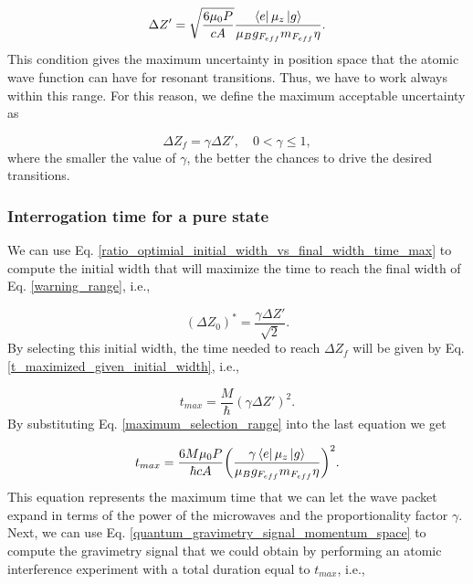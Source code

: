 \documentclass{article}
\begin{document}
\begin{equation}\label{maximum_selection_range}
\Delta Z' = \sqrt{\frac{6 \mu_{0} P}{c A}} \frac{\bra{e} \mu_{z} \ket{g}}{\mu_{B} g_{F_{eff}} m_{F_{eff}} \eta}.
\end{equation}
%
This condition gives the maximum uncertainty in position space that the atomic wave function can have for resonant transitions. Thus, we have to work always within this range. For this reason, we define the maximum acceptable uncertainty as

\begin{equation}\label{warning_range}
    \Delta Z_{f} = \gamma \Delta Z' \mathrm{,} \quad 0 < \gamma \leq 1,
\end{equation}
%
where the smaller the value of $\gamma$, the better the chances to drive the desired transitions. 

\subsubsection{Interrogation time for a pure state}
We can use Eq. \ref{ratio_optimial_initial_width_vs_final_width_time_max} to compute the initial width that will maximize the time to reach the final width of Eq. \ref{warning_range}, i.e.,

\begin{equation}
    (\Delta Z_{0})^{\ast} = \frac{\gamma \Delta Z'}{\sqrt{2}}.
\end{equation}
%
By selecting this initial width, the time needed to reach $\Delta Z_{f}$ will be given by Eq. \ref{t_maximized_given_initial_width}, i.e.,

\begin{equation}
    t_{max} = \frac{M}{\hbar} (\gamma \Delta Z')^2.
\end{equation}
%
By substituting Eq. \ref{maximum_selection_range} into the last equation we get

\begin{equation}\label{total_experiment_time}
    t_{max} = \frac{6 M \mu_{0} P}{\hbar c A} \bigg(\frac{ \gamma  \bra{e} \mu_{z} \ket{g}}{\mu_{B} g_{F_{eff}} m_{F_{eff}} \eta}\bigg)^{2}.
\end{equation}
%
This equation represents the maximum time that we can let the wave packet expand in terms of the power of the microwaves and the proportionality factor $\gamma$. Next, we can use Eq. \ref{quantum_gravimetry_signal_momentum_space} to compute the gravimetry signal that we could obtain by performing an atomic interference experiment with a total duration equal to $t_{max}$, i.e., 
\end{document}
